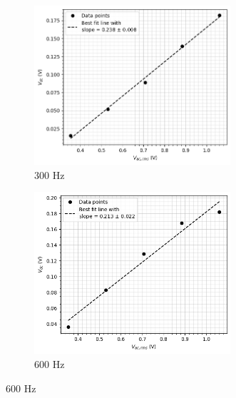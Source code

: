 \begin{figure}[H]
    \begin{subfigure}{\linewidth}
    \centering
    \includegraphics[width=0.8\textwidth]{images/d1.png}
    \caption{300 Hz}
    \end{subfigure}
    
    \begin{subfigure}{\linewidth}
    \centering
    \includegraphics[width=0.8\textwidth]{images/d2.png}
    \caption{600 Hz}
    \end{subfigure} 
     
    \end{figure}
    
